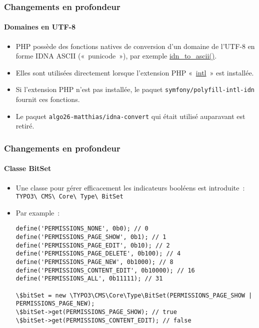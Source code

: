 \begin{frame}[fragile]
	\frametitle{Changements en profondeur}
	\framesubtitle{Domaines en UTF-8}

	\begin{itemize}
		\item PHP possède des fonctions natives de conversion d'un domaine de l'UTF-8 en forme IDNA ASCII
			(«~punicode~»), par exemple \href{https://www.php.net/manual/en/function.idn-to-ascii.php}{idn\_to\_ascii()}.

		\item Elles sont utilisées directement lorsque l'extension PHP
			«~\href{https://www.php.net/manual/en/book.intl.php}{intl}~» est installée.

		\item Si l'extension PHP n'est pas installée, le paquet \texttt{symfony/polyfill-intl-idn}
			fournit ces fonctions.

		\item Le paquet \texttt{algo26-matthias/idna-convert} qui était utilisé auparavant est retiré.

	\end{itemize}

\end{frame}


\begin{frame}[fragile]
	\frametitle{Changements en profondeur}
	\framesubtitle{Classe BitSet}

	\lstset{basicstyle=\tiny\ttfamily}

	\begin{itemize}
		\item Une classe pour gérer efficacement les indicateurs booléens est introduite~:\newline
			\texttt{TYPO3\textbackslash
				CMS\textbackslash
				Core\textbackslash
				Type\textbackslash
				BitSet}

		\item Par example~:
\begin{lstlisting}
define('PERMISSIONS_NONE', 0b0); // 0
define('PERMISSIONS_PAGE_SHOW', 0b1); // 1
define('PERMISSIONS_PAGE_EDIT', 0b10); // 2
define('PERMISSIONS_PAGE_DELETE', 0b100); // 4
define('PERMISSIONS_PAGE_NEW', 0b1000); // 8
define('PERMISSIONS_CONTENT_EDIT', 0b10000); // 16
define('PERMISSIONS_ALL', 0b11111); // 31

\$bitSet = new \TYPO3\CMS\Core\Type\BitSet(PERMISSIONS_PAGE_SHOW | PERMISSIONS_PAGE_NEW);
\$bitSet->get(PERMISSIONS_PAGE_SHOW); // true
\$bitSet->get(PERMISSIONS_CONTENT_EDIT); // false
\end{lstlisting}

	\end{itemize}

\end{frame}

